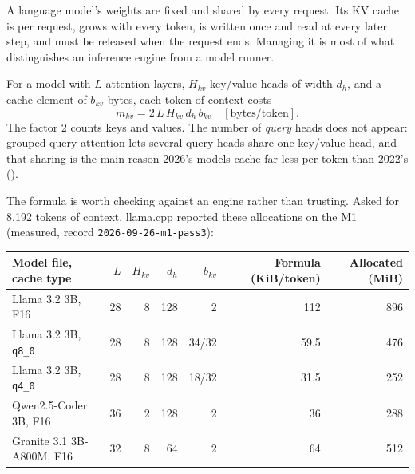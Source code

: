 A language model's weights are fixed and shared by every request. Its KV cache
is per request, grows with every token, is written once and read at every
later step, and must be released when the request ends. Managing it is most of
what distinguishes an inference engine from a model runner.



For a model with $L$ attention layers, $H_{kv}$ key/value heads of width $d_h$,
and a cache element of $b_{kv}$ bytes, each token of context costs
\begin{equation}
m_{kv} = 2\,L\,H_{kv}\,d_h\,b_{kv}\quad[\text{bytes/token}].
\label{eq:kv-per-token}
\end{equation}
The factor 2 counts keys and values. The number of \emph{query} heads does not
appear: grouped-query attention lets several query heads share one key/value
head, and that sharing is the main reason 2026's models cache far less per
token than 2022's ().

The formula is worth checking against an engine rather than trusting. Asked
for 8,192 tokens of context, llama.cpp reported these allocations on the M1
(measured, record \texttt{2026-09-26-m1-pass3}):

\begin{center}\small
\begin{tabular}{@{}lrrrrrr@{}}
\toprule
Model file, cache type & $L$ & $H_{kv}$ & $d_h$ & $b_{kv}$ & Formula (KiB/token) & Allocated (MiB) \\
\midrule
Llama 3.2 3B, F16 & 28 & 8 & 128 & 2 & 112 & 896 \\
Llama 3.2 3B, \texttt{q8\_0} & 28 & 8 & 128 & 34/32 & 59.5 & 476 \\
Llama 3.2 3B, \texttt{q4\_0} & 28 & 8 & 128 & 18/32 & 31.5 & 252 \\
Qwen2.5-Coder 3B, F16 & 36 & 2 & 128 & 2 & 36 & 288 \\
Granite 3.1 3B-A800M, F16 & 32 & 8 & 64 & 2 & 64 & 512 \\
\bottomrule
\end{tabular}
\end{center}

